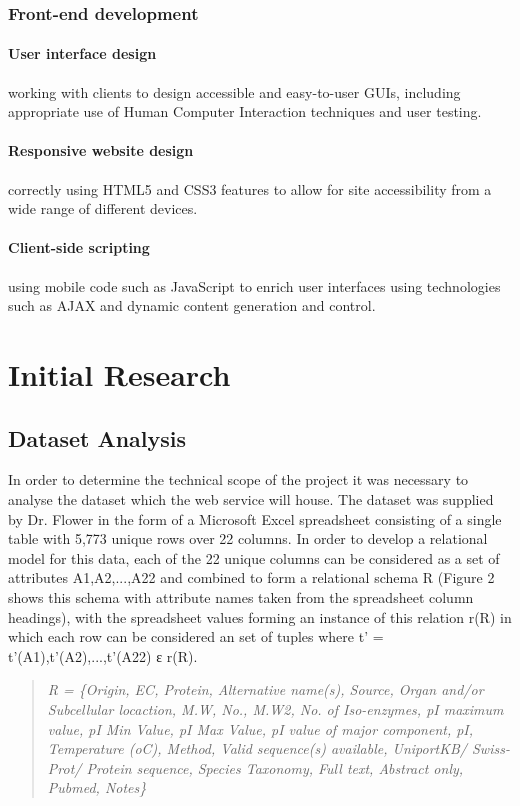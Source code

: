 \documentclass[12pt,a4paper]{article}
\begin{document}
\subsubsection{Front-end development}

\paragraph{User interface design} working with clients to design accessible and
easy-to-user GUIs, including appropriate use of Human Computer Interaction
techniques and user testing.

\paragraph{Responsive website design} correctly using HTML5 and CSS3 features to
allow for site accessibility from a wide range of different devices.

\paragraph{Client-side scripting} using mobile code such as JavaScript to enrich
user interfaces using technologies such as AJAX and dynamic content generation
and control.

\section{Initial Research}

\subsection{Dataset Analysis}

In order to determine the technical scope of the project it was necessary to
analyse the dataset which the web service will house. The dataset was supplied
by Dr. Flower in the form of a Microsoft Excel spreadsheet consisting of a
single table with 5,773 unique rows over 22 columns. In order to develop a
relational model for this data, each of the 22 unique columns can be considered
as a set of attributes A1,A2,...,A22 and combined to form a relational schema R
(Figure 2 shows this schema with attribute names taken from the spreadsheet
column headings), with the spreadsheet values forming an instance of this
relation r(R) in which each row can be considered an set of tuples where t’ =
{t’(A1),t’(A2),...,t’(A22)} ε r(R).

\begin{quote}
\textit{R = \{Origin, EC, Protein, Alternative name(s), Source, Organ and/or
  Subcellular locaction, M.W, No., M.W2, No. of Iso-enzymes, pI maximum value,
  pI Min Value, pI Max Value, pI value of major component, pI, Temperature (oC),
  Method, Valid sequence(s) available, UniportKB/ Swiss-Prot/ Protein sequence,
  Species Taxonomy, Full text, Abstract only, Pubmed, Notes\}}
\end{quote}
\end{document}
